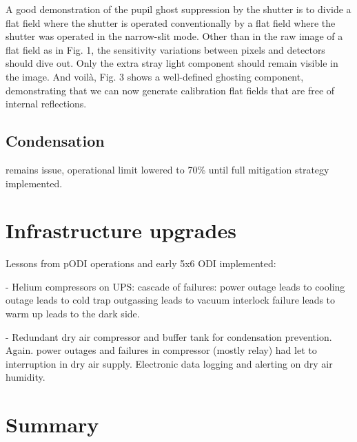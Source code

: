 \documentclass[]{spieman}
\begin{document}
A good demonstration of the pupil ghost suppression by the shutter is to
divide a flat field where the shutter is operated conventionally by a flat
field where the shutter was operated in the narrow-slit mode. Other than in
the raw image of a flat field as in Fig. 1, the sensitivity variations
between pixels and detectors should dive out. Only the extra stray light
component should remain visible in the image. And voilà, Fig. 3 shows a
well-defined ghosting component, demonstrating that we can now generate
calibration flat fields that are free of internal reflections.


\subsection{Condensation}

remains issue, operational limit lowered to 70\% until full mitigation
strategy implemented.



\section{Infrastructure upgrades}

Lessons from pODI operations and early 5x6 ODI implemented:

- Helium compressors on UPS: cascade of failures: power outage leads to cooling outage leads to 
cold trap outgassing leads to vacuum interlock failure leads to warm up leads to the dark side. 

- Redundant dry air compressor and buffer tank for condensation prevention. Again. power outages 
and failures in compressor (mostly relay) had let to interruption in dry air supply.  Electronic 
data logging and alerting on dry air humidity.




\section{Summary}

\acknowledgments


 
\end{document}
